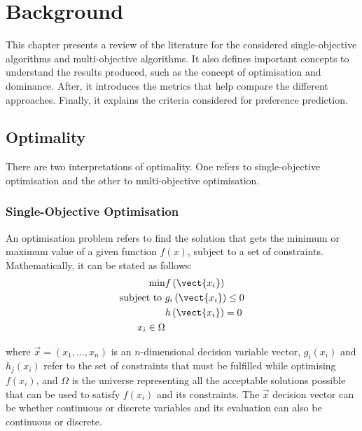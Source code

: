 \chapter{Background}
\label{chapter:chapter02}

This chapter presents a review of the literature for the considered single-objective algorithms and multi-objective algorithms. It also defines important concepts to understand the results produced, such as the concept of optimisation and dominance. After, it introduces the metrics that help compare the different approaches. Finally, it explains the criteria considered for preference prediction.

\section{Optimality}

There are two interpretations of optimality. One refers to single-objective optimisation and the other to multi-objective optimisation.\\

\subsection{Single-Objective Optimisation}

An optimisation problem refers to find the solution that gets the minimum or maximum value of a given function $f(x)$, subject to a set of constraints. Mathematically, it can be stated as follows:\\
 
 \begin{equation}
     \begin{aligned}
     \min & f\left( \vect{x_i}\right)\\
     \text{subject to } & g_i\left( \vect{x_i}\right) \leq 0\\
     & h\left( \vect{x_i}\right) = 0\\
     x_i \in \Omega
     \end{aligned}
 \end{equation}
 
\noindent where $\vec{x} = (x_1,...,x_n)$ is an $n$-dimensional decision variable vector, $g_i(x_i)$ and $h_j(x_i)$ refer to the set of constraints that must be fulfilled while optimising $f(x_i)$, and $\Omega$ is the universe representing all the acceptable solutions possible that can be used to satisfy $f(x_i)$ and its constraints. The $\vec{x}$ decision vector can be whether continuous or discrete variables and its evaluation can also be continuous or discrete.\\

